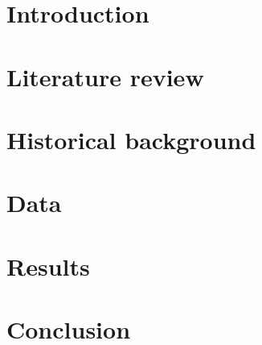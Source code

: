 
\section*{Introduction}



\newpage
\section{Literature review}


\newpage
\section{Historical background}



\newpage
\section{Data}




\newpage
\section{Results}


\newpage

\section*{Conclusion}



